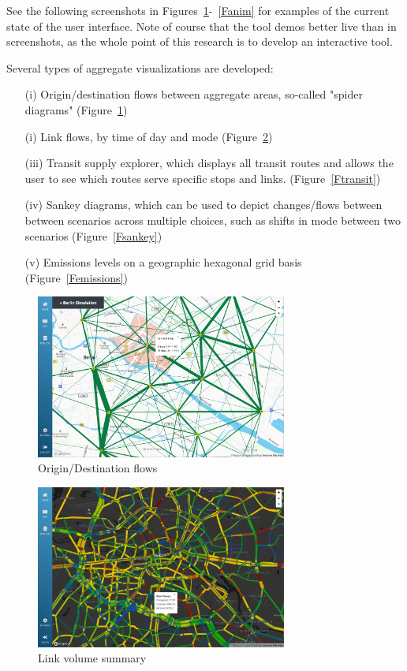 \documentclass[Afour,sagev,times]{sagej}
\begin{document}
See the following screenshots in Figures~\ref{Fod}-~\ref{Fanim} for examples of the current state of the user interface. Note of course that the tool demos better live than in screenshots, as the whole point of this research is to develop an interactive tool.

Several types of aggregate visualizations are developed:

\begin{enumerate}

\item[(i)] Origin/destination flows between aggregate areas, so-called "spider diagrams" (Figure~\ref{Fod})
\item[(i)] Link flows, by time of day and mode (Figure~\ref{Flinkvols})
\item[(iii)] Transit supply explorer, which displays all transit routes and allows the user to see which routes serve specific stops and links. (Figure~\ref{Ftransit})
\item[(iv)] Sankey diagrams, which can be used to depict changes/flows between between scenarios across multiple choices, such as shifts in mode between two scenarios (Figure~\ref{Fsankey})
\item[(v)] Emissions levels on a geographic hexagonal grid basis (Figure~\ref{Femissions})

\end{enumerate}

\begin{figure}
\centering
\includegraphics[width=3.25in]{fig-odflow.png}
\caption{Origin/Destination flows}\label{Fod}
\end{figure}

\begin{figure}
\centering
\includegraphics[width=3.25in]{fig-linkvols.png}
\caption{Link volume summary}\label{Flinkvols}
\end{figure}
\end{document}
